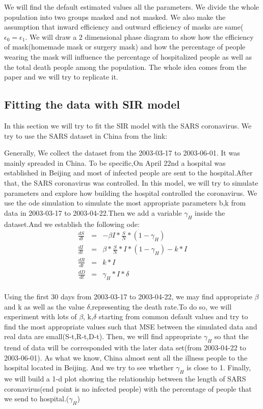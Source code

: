 \documentclass{article}
\begin{document}
We will find the default estimated values all the parameters. We divide the whole population into two groups masked and not masked.
We also make the assumption that inward efficiency and outward efficiency of masks are same($\epsilon_{0} = \epsilon_{1}$. We will draw a 2 dimensional phase diagram to show how the efficiency of mask(homemade mask or surgery mask) and how the percentage of people wearing the mask will influence the percentage of hospitalized people as well as the total death people among the population. The whole idea comes from the paper and we will try to replicate it.


\subsection{Fitting the data with SIR model}
In this section we will try to fit the SIR model with the SARS  coronavirus. We try to use the SARS dataset in China from the link:\cite{SARSsource}

Generally, We collect the dataset from the 2003-03-17 to 2003-06-01. It was mainly spreaded in China. To be specific,On April 22nd a hospital was established in Beijing and most of infected people are sent to the hospital.After that, the SARS coronavirus was controlled. In this model, we will try to simulate parameters and explore how building the hospital controlled the coronavirus. We use the ode simulation to simulate the most appropriate parameters b,k from data in 2003-03-17 to 2003-04-22.Then we add a variable $\gamma_{H}$ inside the dataset.And we establish the following ode:
\begin{eqnarray}
  \frac{dS}{dt} &=& -\beta I*\frac{S}{N}*(1-\gamma_{H})\\
  \frac{dI}{dt} &=& \beta *\frac{S}{N}*I*(1-\gamma_{H})- k*I\\
  \frac{dR}{dt} &=& k*I\\
  \frac{dD}{dt} &=& \gamma_{H}*I*\delta\\
\end{eqnarray}

Using the first 30 days from 2003-03-17 to 2003-04-22, we may find appropriate $\beta$ and k as well as the value $\delta$,representing the death rate.To do so, we will experiment with lots of $\beta$, k,$\delta$ starting from common default values and try to find the most appropriate values such that MSE between the simulated data and real data are small(S-t,R-t,D-t).  Then, we will find appropriate $\gamma_{H}$ so that the trend of data will be corresponded with the later data set(from  2003-04-22 to 2003-06-01). As what we know, China almost sent all the illness people to the hospital located in Beijing. And we try to see whether $\gamma_{H}$ is close to 1.
Finally, we will build a 1-d plot showing the relationship between the length of SARS coronavirus(end point is no infected people) with the percentage of people that we send to hospital.($\gamma_{H}$)
\end{document}
